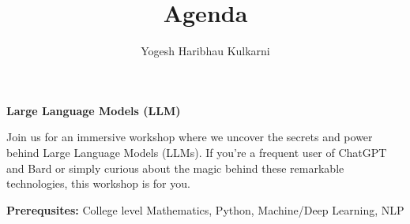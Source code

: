 \documentclass[a4paper, 11pt]{article}
\title{Agenda}
\author{Yogesh Haribhau Kulkarni}
\begin{document}
\pagestyle{mystyle}

\makebox[\linewidth]{}
\begin{center} 
\textbf{\Large Large Language Models (LLM)}
\end{center}

Join us for an immersive workshop where we uncover the secrets and power behind Large Language Models (LLMs). 
If you're a frequent user of ChatGPT and Bard or simply curious about the magic behind these remarkable technologies, 
this workshop is for you. 

\makebox[\linewidth]{}

\textbf{Prerequsites:}  College level Mathematics, Python, Machine/Deep Learning, NLP

\end{document}
